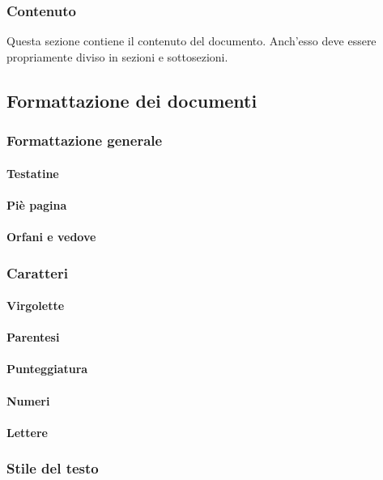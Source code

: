 \documentclass[../NormeProgetto.tex]{subfiles}
\begin{document}
		\subsubsection{Contenuto}
		Questa sezione contiene il contenuto del documento. Anch'esso deve essere propriamente diviso in sezioni e sottosezioni.
	
	\subsection{Formattazione dei documenti}
		\subsubsection{Formattazione generale}
			\paragraph{Testatine}	
			\paragraph{Piè pagina}
			\paragraph{Orfani e vedove}
		\subsubsection{Caratteri}
			\paragraph{Virgolette}
			\paragraph{Parentesi}
			\paragraph{Punteggiatura}
			\paragraph{Numeri}
			\paragraph{Lettere}
		\subsubsection{Stile del testo}
\end{document}
